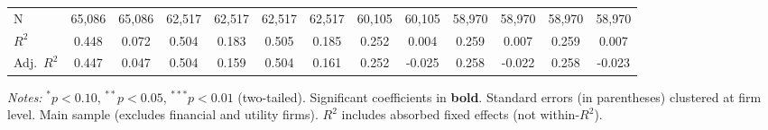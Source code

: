 \documentclass[11pt,a4paper]{article}
\begin{document}
\begin{table}[htbp]
\begin{tabular}{lcccccccccccc}
\midrule
N & 65,086 & 65,086 & 62,517 & 62,517 & 62,517 & 62,517 & 60,105 & 60,105 & 58,970 & 58,970 & 58,970 & 58,970 \\
$R^2$ & 0.448 & 0.072 & 0.504 & 0.183 & 0.505 & 0.185 & 0.252 & 0.004 & 0.259 & 0.007 & 0.259 & 0.007 \\
Adj.~$R^2$ & 0.447 & 0.047 & 0.504 & 0.159 & 0.504 & 0.161 & 0.252 & -0.025 & 0.258 & -0.022 & 0.258 & -0.023 \\
\bottomrule
\end{tabular}
\begin{minipage}{\linewidth}
\vspace{2pt}\scriptsize
\textit{Notes:} $^{*}p<0.10$, $^{**}p<0.05$, $^{***}p<0.01$ (two-tailed).
 Significant coefficients in \textbf{bold}.
 Standard errors (in parentheses) clustered at firm level.
 Main sample (excludes financial and utility firms).
 $R^2$ includes absorbed fixed effects (not within-$R^2$).
\end{minipage}
\end{table}
\clearpage
\end{document}
